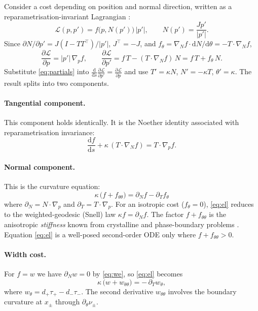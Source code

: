 \documentclass[11pt,a4paper]{article}
\numberwithin{equation}{section}
\theoremstyle{plain}
\theoremstyle{definition}
\theoremstyle{remark}
\newcommand{\dd}{\mathrm{d}}
\begin{document}
Consider a cost depending on position and normal direction, written as a reparametrisation-invariant Lagrangian \citep{gelfand1963}:
\begin{equation}
\mathcal L(p,p') = f\bigl(p,N(p')\bigr)\,|p'|, \qquad N(p') = \frac{Jp'}{|p'|}.
\label{eq:lagrangian}
\end{equation}
Since $\partial N/\partial p' = J(I-TT^{\!\top})/|p'|$, $J^{\!\top}=-J$, and $f_\theta = \nabla_N f\cdot\dd N/\dd\theta = -T\cdot\nabla_N f$,
\begin{equation}
\frac{\partial\mathcal L}{\partial p} = |p'|\,\nabla_p f,
\qquad
\frac{\partial\mathcal L}{\partial p'} = f\,T - (T\cdot\nabla_N f)\,N = f\,T + f_\theta\,N .
\label{eq:partials}
\end{equation}
Substitute \eqref{eq:partials} into $\frac{\dd}{\dd s}\frac{\partial\mathcal L}{\partial p'}=\frac{\partial\mathcal L}{\partial p}$ and use $T'=\kappa N$, $N'=-\kappa T$, $\theta'=\kappa$. The result splits into two components.

\paragraph{Tangential component.} This component holds identically. It is the Noether identity associated with reparametrisation invariance:
\begin{equation}
\frac{\dd f}{\dd s} + \kappa\,(T\cdot\nabla_N f) = T\cdot\nabla_p f .
\label{eq:el-tangential}
\end{equation}

\paragraph{Normal component.} This is the curvature equation:
\begin{equation}
\boxed{\;\kappa\,\bigl(f+f_{\theta\theta}\bigr) = \partial_N f - \partial_T f_\theta\;}
\label{eq:el}
\end{equation}
where $\partial_N = N\cdot\nabla_p$ and $\partial_T = T\cdot\nabla_p$. For an isotropic cost ($f_\theta=0$), \eqref{eq:el} reduces to the weighted-geodesic (Snell) law $\kappa f=\partial_N f$. The factor $f+f_{\theta\theta}$ is the anisotropic \emph{stiffness} known from crystalline and phase-boundary problems \citep{taylor1978,gurtin1993}. Equation \eqref{eq:el} is a well-posed second-order ODE only where $f+f_{\theta\theta}>0$.

\paragraph{Width cost.} For $f=w$ we have $\partial_N w = 0$ by \eqref{eq:we}, so \eqref{eq:el} becomes
\begin{equation}
\kappa\,\bigl(w+w_{\theta\theta}\bigr) = -\,\partial_T w_\theta ,
\label{eq:el-width}
\end{equation}
where $w_\theta = d_+\tau_+ - d_-\tau_-$. The second derivative $w_{\theta\theta}$ involves the boundary curvature at $x_\pm$ through $\partial_\theta\nu_\pm$.
\end{document}
